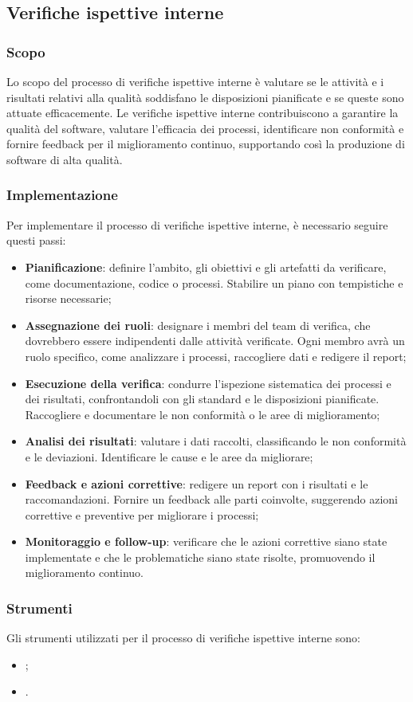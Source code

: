 \subsection{Verifiche ispettive interne}
\subsubsection{Scopo}
Lo scopo del processo di verifiche ispettive interne è valutare se le attività e i risultati relativi alla qualità soddisfano le disposizioni pianificate e se queste sono attuate efficacemente. Le verifiche ispettive interne contribuiscono a garantire la qualità del software, valutare l'efficacia dei processi, identificare non conformità e fornire feedback per il miglioramento continuo, supportando così la produzione di software di alta qualità.

\subsubsection{Implementazione}
Per implementare il processo di verifiche ispettive interne, è necessario seguire questi passi:
\begin{itemize}
    \item \textbf{Pianificazione}: definire l’ambito, gli obiettivi e gli artefatti da verificare, come documentazione, codice o processi. Stabilire un piano con tempistiche e risorse necessarie;
    \item \textbf{Assegnazione dei ruoli}: designare i membri del team di verifica, che dovrebbero essere indipendenti dalle attività verificate. Ogni membro avrà un ruolo specifico, come analizzare i processi, raccogliere dati e redigere il report;
    \item \textbf{Esecuzione della verifica}: condurre l'ispezione sistematica dei processi e dei risultati, confrontandoli con gli standard e le disposizioni pianificate. Raccogliere e documentare le non conformità o le aree di miglioramento;
    \item \textbf{Analisi dei risultati}: valutare i dati raccolti, classificando le non conformità e le deviazioni. Identificare le cause e le aree da migliorare;
    \item \textbf{Feedback e azioni correttive}: redigere un report con i risultati e le raccomandazioni. Fornire un feedback alle parti coinvolte, suggerendo azioni correttive e preventive per migliorare i processi;
    \item \textbf{Monitoraggio e follow-up}: verificare che le azioni correttive siano state implementate e che le problematiche siano state risolte, promuovendo il miglioramento continuo.
\end{itemize}

\subsubsection{Strumenti}
Gli strumenti utilizzati per il processo di verifiche ispettive interne sono:
\begin{itemize}
    \item {};
    \item {}.
\end{itemize}